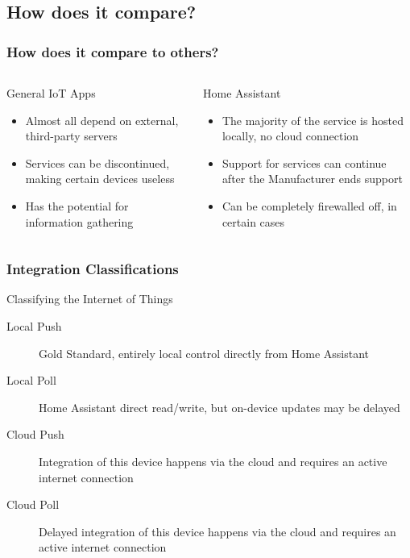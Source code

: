 \documentclass[aspectratio=169]{beamer}
\begin{document}
\subsection{How does it compare?}
\frame{\subsectionpage}
\begin{frame}[fragile]
  \frametitle{How does it compare to others?}
  \begin{columns}[]
    \begin{column}[T]{0.45\paperwidth}
      \Large{General IoT Apps}
      \begin{itemize}
        \item{Almost all depend on external, third-party servers}
        \item{Services can be discontinued, making certain devices useless}
        \item{Has the potential for information gathering}
      \end{itemize}
    \end{column}
    \begin{column}[T]{0.45\paperwidth}
      \Large{Home Assistant}
      \begin{itemize}
        \item{The majority of the service is hosted locally, no cloud connection}
        \item{Support for services can continue after the Manufacturer ends support}
        \item{Can be completely firewalled off, in certain cases}
      \end{itemize}
    \end{column}
  \end{columns}
\end{frame}
\begin{frame}[fragile]
  \frametitle{Integration Classifications}
  Classifying the Internet of Things
  \vfill
  \begin{description}%
    \item[Local Push]{Gold Standard, entirely local control directly from Home Assistant}
    \item[Local Poll]{Home Assistant direct read/write, but on-device updates may be delayed}
    \item[Cloud Push]{Integration of this device happens via the cloud and requires an active internet connection}
    \item[Cloud Poll]{Delayed integration of this device happens via the cloud and requires an active internet connection}
  \end{description}
\end{frame}
\end{document}
